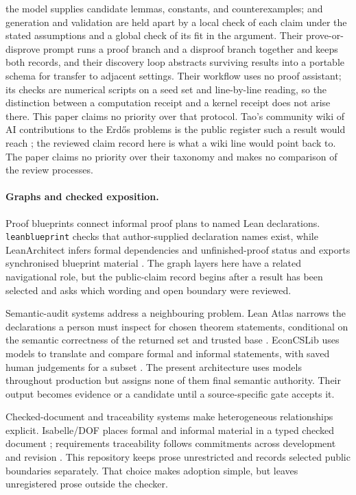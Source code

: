 \documentclass[10pt]{article}
\begin{document}
the model supplies candidate lemmas, constants, and counterexamples; and
generation and validation are held apart by a local check of each claim
under the stated assumptions and a global check of its fit in the argument.
Their prove-or-disprove prompt runs a proof branch and a disproof branch
together and keeps both records, and their discovery loop abstracts
surviving results into a portable schema for transfer to adjacent settings.
Their workflow uses no proof assistant; its checks are numerical scripts on
a seed set and line-by-line reading, so the distinction between a
computation receipt and a kernel receipt does not arise there. This paper
claims no priority over that protocol. Tao's
community wiki of AI contributions to the Erd\H{o}s problems is the public
register such a result would reach \cite{taowiki}; the reviewed claim record
here is what a wiki line would point back to. The paper claims no priority
over their taxonomy and makes no comparison of the review processes.

\paragraph{Graphs and checked exposition.}
Proof blueprints connect informal proof plans to named Lean declarations.
\texttt{leanblueprint} checks that author-supplied declaration names exist,
while LeanArchitect infers formal dependencies and unfinished-proof status and
exports synchronised blueprint material \cite{leanblueprint,leanarchitect}.
The graph layers here have a related navigational role, but the public-claim
record begins after a result has been selected and asks which wording and open
boundary were reviewed.

Semantic-audit systems address a neighbouring problem. Lean Atlas narrows the
declarations a person must inspect for chosen theorem statements, conditional
on the semantic correctness of the returned set and trusted base
\cite{leanatlas}. EconCSLib uses models to translate and compare formal and
informal statements, with saved human judgements for a subset \cite{econcs}.
The present architecture uses models throughout production but assigns none of
them final semantic authority. Their output becomes evidence or a candidate
until a source-specific gate accepts it.

Checked-document and traceability systems make heterogeneous relationships
explicit. Isabelle/DOF places formal and informal material in a typed checked
document \cite{isadof}; requirements traceability follows commitments across
development and revision \cite{gotel}. This repository keeps prose unrestricted
and records selected public boundaries separately. That choice makes adoption
simple, but leaves unregistered prose outside the checker.
\end{document}
